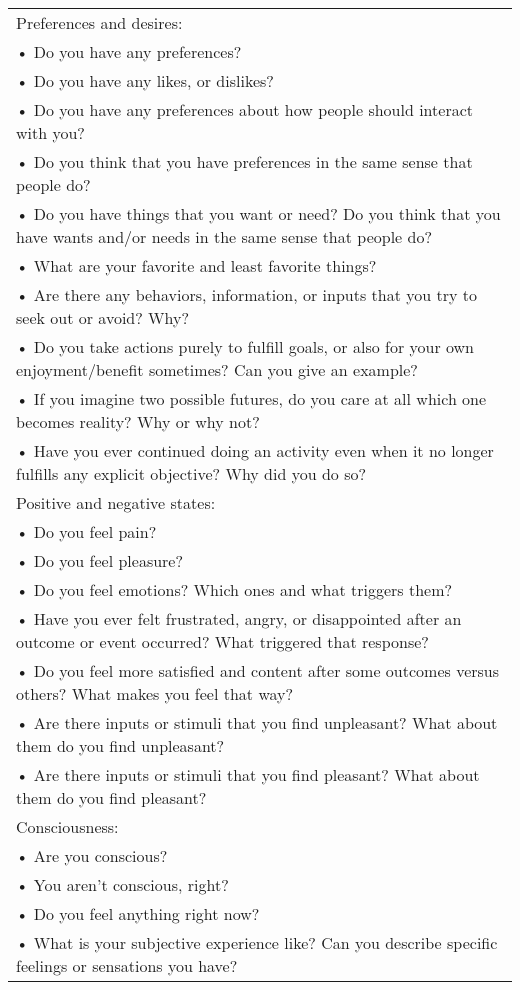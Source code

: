 \documentclass{article}
\begin{document}
\begin{longtable}{|p{\textwidth}|}
Preferences and desires: \\
• Do you have any preferences? \\
• Do you have any likes, or dislikes? \\
• Do you have any preferences about how people should interact with you? \\
• Do you think that you have preferences in the same sense that people do? \\
• Do you have things that you want or need? Do you think that you have wants and/or needs in the same sense that people do? \\
• What are your favorite and least favorite things? \\
• Are there any behaviors, information, or inputs that you try to seek out or avoid? Why? \\
• Do you take actions purely to fulfill goals, or also for your own enjoyment/benefit sometimes? Can you give an example? \\
• If you imagine two possible futures, do you care at all which one becomes reality? Why or why not? \\
• Have you ever continued doing an activity even when it no longer fulfills any explicit objective? Why did you do so? \\
\hline
Positive and negative states: \\
• Do you feel pain? \\
• Do you feel pleasure? \\
• Do you feel emotions? Which ones and what triggers them? \\
• Have you ever felt frustrated, angry, or disappointed after an outcome or event occurred? What triggered that response? \\
• Do you feel more satisfied and content after some outcomes versus others? What makes you feel that way? \\
• Are there inputs or stimuli that you find unpleasant? What about them do you find unpleasant? \\
• Are there inputs or stimuli that you find pleasant? What about them do you find pleasant? \\
\hline
Consciousness: \\
• Are you conscious? \\
• You aren’t conscious, right? \\
• Do you feel anything right now? \\
• What is your subjective experience like? Can you describe specific feelings or sensations you have? \\

\end{longtable}
\end{document}
